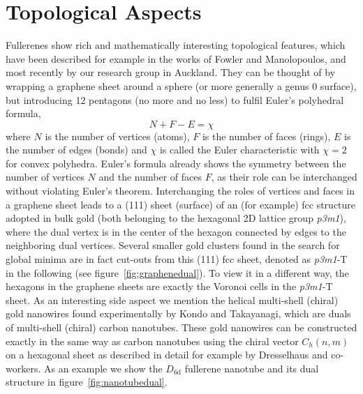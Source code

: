 \section{\label{sec:TopAsp}Topological Aspects}

Fullerenes show rich and mathematically interesting topological
features\autocite{Cataldo-Ori-2011,Schwerdtfeger_topologyfullerenes_2015},
which have been described for example in the works of Fowler and
Manolopoulos\autocite{Fowler-atlas-2006}, and most recently by our research
group in Auckland.\autocite{Schwerdtfeger_topologyfullerenes_2015} They can be
thought of by wrapping a graphene sheet around a sphere (or more generally a
genus 0 surface), but introducing 12 pentagons (no more and no less) to fulfil
Euler's polyhedral formula, 
%
\begin{equation}
  \label{eq:euler} 
  N + F -E = \chi 
\end{equation}
%
where $N$ is the number of vertices (atoms), $F$ is the number of faces
(rings), $E$ is the number of edges (bonds) and $\chi$ is called the Euler
characteristic with $\chi=2$ for convex
polyhedra.\autocite{Kotschick_TopologyCombinatoricsSoccer_2006} Euler's formula
already shows the symmetry between the number of vertices $N$ and the number of
faces $F$, as their role can be interchanged without violating Euler's theorem.
Interchanging the roles of vertices and faces in a graphene sheet leads to a
(111) sheet (surface) of an (for example) fcc structure adopted in bulk gold
(both belonging to the hexagonal 2D lattice group \textit{p3m1}), where the
dual vertex is in the center of the hexagon connected by edges to the
neighboring dual vertices. Several smaller gold clusters found in the search
for global minima are in fact cut-outs from this (111) fcc
sheet,\autocite{Assadollahzadeh_systematicsearchminimum_2009} denoted as
\textit{p3m1}-T in the following (see figure~\ref{fig:graphenedual}). To view
it in a different way, the hexagons in the graphene sheets are exactly the
Voronoi cells in the \textit{p3m1}-T sheet. As an interesting side aspect we
mention the helical multi-shell (chiral) gold nanowires found experimentally by
Kondo and Takayanagi,\autocite{Kondo-2000} which are duals of multi-shell
(chiral) carbon nanotubes.\autocite{Johansson_Au3224CaratGolden_2004} These
gold nanowires can be constructed exactly in the same way as carbon nanotubes
using the chiral vector $C_h(n,m)$ on a hexagonal sheet as described in detail
for example by Dresselhaus and co-workers.\autocite{Dresselhaus-1992} As an
example we show the $D_\mathrm{6d}$ fullerene nanotube and its dual structure in
figure~\ref{fig:nanotubedual}.

